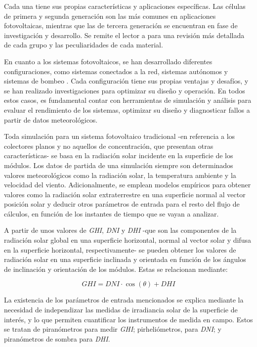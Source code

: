 Cada una tiene sus propias características y aplicaciones específicas. Las células de primera y segunda generación son las más comunes en aplicaciones fotovoltaicas, mientras que las de tercera generación se encuentran en fase de investigación y desarrollo. Se remite el lector a \cite{Shubbak_2019} para una revisión más detallada de cada grupo y las peculiaridades de cada material.

En cuanto a los sistemas fotovoltaicos, se han desarrollado diferentes configuraciones, como sistemas conectados a la red, sistemas autónomos y sistemas de bombeo \cite{Perpinan2020}. Cada configuración tiene sus propias ventajas y desafíos, y se han realizado investigaciones para optimizar su diseño y operación. En todos estos casos, es fundamental contar con herramientas de simulación y análisis para evaluar el rendimiento de los sistemas, optimizar su diseño y diagnosticar fallos a partir de datos meteorológicos.

Toda simulación para un sistema fotovoltaico tradicional -en referencia a los colectores planos y no aquellos de concentración, que presentan otras características- se basa en la radiación solar incidente en la superficie de los módulos. Los datos de partida de una simulación siempre son determinados valores meteorológicos como la radiación solar, la temperatura ambiente y la velocidad del viento. Adicionalmente, se emplean modelos empíricos para obtener valores como la radiación solar extraterrestre en una superficie normal al vector posición solar y deducir otros parámetros de entrada para el resto del flujo de cálculos, en función de los instantes de tiempo que se vayan a analizar.

A partir de unos valores de \textit{GHI}, \textit{DNI} y \textit{DHI} -que son las componentes de la radiación solar global en una superficie horizontal, normal al vector solar y difusa en la superficie horizontal, respectivamente- se pueden obtener los valores de radiación solar en una superficie inclinada y orientada en función de los ángulos de inclinación y orientación de los módulos. Estas se relacionan mediante:

\begin{equation}
      GHI = DNI \cdot \cos(\theta) + DHI
\end{equation}

La existencia de los parámetros de entrada mencionados se explica mediante la necesidad de independizar las medidas de irradiancia solar de la superficie de interés, y lo que permiten cuantificar los instrumentos de medida en campo. Estos se tratan de piranómetros para medir \textit{GHI}; pirheliómetros, para \textit{DNI}; y piranómetros de sombra para \textit{DHI}.

